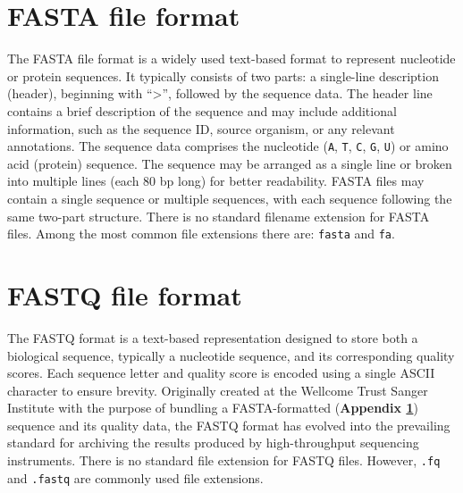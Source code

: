 \documentclass[a4paper, titlepage, openright]{book}
\begin{document}
\section{FASTA file format}\label{section:fasta-format}
The FASTA file format is a widely used text-based format to represent nucleotide or protein sequences. It typically consists of two parts: a single-line description (header), beginning with ``>'', followed by the sequence data. The header line contains a brief description of the sequence and
may include additional information, such as the sequence ID, source organism, or any relevant annotations. The sequence data comprises the nucleotide (\texttt{A}, \texttt{T}, \texttt{C}, \texttt{G}, \texttt{U}) or amino acid (protein) sequence. The sequence may be arranged as a single line or broken into multiple lines (each 80 bp long) for better readability. FASTA files may contain a single sequence or multiple sequences, with each sequence following the same two-part structure. There is no standard filename extension for FASTA files. Among the most common file extensions there are: \texttt{fasta} and \texttt{fa}.

\section{FASTQ file format}\label{section:fastq-format}
The FASTQ format is a text-based representation designed to store both a biological sequence, typically a nucleotide sequence, and its corresponding quality scores. Each sequence letter and quality score is encoded using a single ASCII character to ensure brevity. Originally created at the Wellcome Trust Sanger Institute with the purpose of bundling a FASTA-formatted (\textbf{Appendix \ref{section:fasta-format}}) sequence and its quality data, the FASTQ format has evolved into the prevailing standard for archiving the results produced by high-throughput sequencing instruments. There is no standard file extension for FASTQ files. However, \texttt{.fq} and \texttt{.fastq} are commonly used file extensions.

\end{document}
